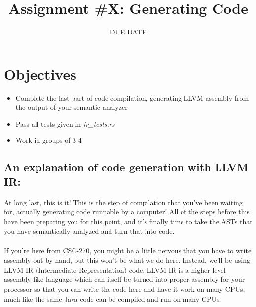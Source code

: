 \documentclass[
	12pt, %
]{fphw}
\title{Assignment \#X: Generating Code} %
\date{DUE DATE} %
\institute{Union College} %
\begin{document}
\maketitle %


\section*{Objectives}

\begin{problem}
	\begin{itemize}
        \item Complete the last part of code compilation, generating LLVM assembly from the output of your semantic analyzer
        \item Pass all tests given in \textit{ir\_tests.rs}
        \item Work in groups of 3-4
        
	\end{itemize}
\end{problem}


\subsection*{An explanation of code generation with LLVM IR:}
At long last, this is it! This is the step of compilation that you've been waiting for, actually generating code runnable by a computer! All of the steps before this have been preparing you for this point, and it's finally time to take the ASTs that you have semantically analyzed and turn that into code.\\
\\
If you're here from CSC-270, you might be a little nervous that you have to write assembly out by hand, but this won't be what we do here. Instead, we'll be using LLVM IR (Intermediate Representation) code. LLVM IR is a higher level assembly-like language which can itself be turned into proper assembly for your processor so that you can write the code here and have it work on many CPUs, much like the same Java code can be compiled and run on many CPUs.  
\pagebreak
\end{document}
